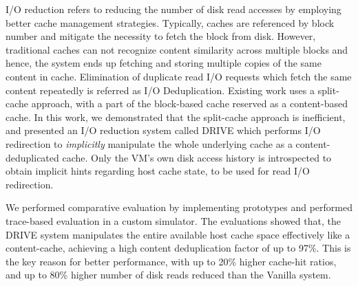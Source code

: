 
I/O reduction refers to reducing the number of disk read accesses by
employing better cache management strategies. Typically, caches are 
referenced by block number and mitigate the necessity to fetch the block
from disk. However, traditional caches can not recognize content similarity
across multiple blocks and hence, the system ends up fetching and storing 
multiple copies of the same content in cache.
Elimination of duplicate read I/O requests which fetch the same 
content repeatedly is referred as I/O Deduplication.
Existing work uses a split-cache approach, with a part of the block-based
cache reserved as a content-based cache. In this work, we demonstrated
that the split-cache approach is inefficient, and presented an
I/O reduction system called DRIVE which performs I/O 
redirection to \textit{implicitly} manipulate the whole underlying cache as 
a content-deduplicated cache. Only the VM's own disk access history is
introspected to obtain implicit hints regarding host cache state, to be used
for read I/O redirection.

We performed comparative evaluation by implementing 
prototypes and performed trace-based evaluation in a custom simulator. 
The evaluations showed that, 
the DRIVE system
manipulates the entire available host cache space effectively like
a content-cache, achieving a high content deduplication factor of up to 97\%.
This is the key reason for better performance, with
up to 20\% higher cache-hit ratios,
and up to 80\% higher number of disk reads reduced than the Vanilla system.
